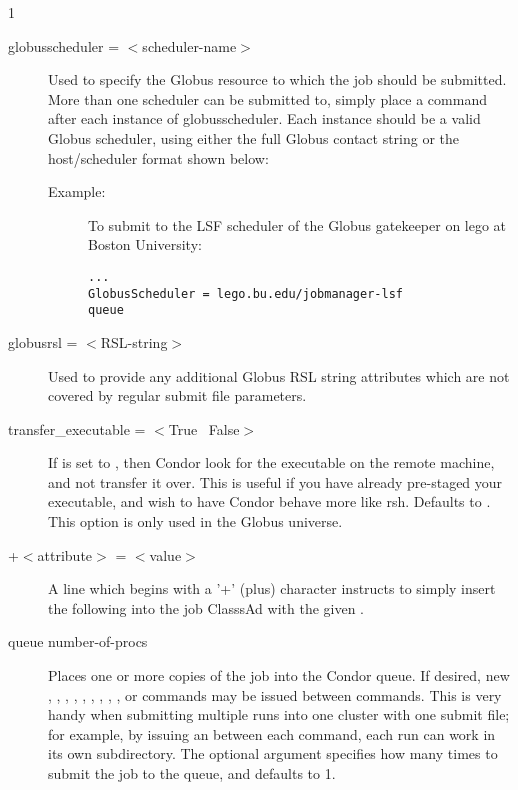 \begin{ManPage}{\label{man-condor-submit}}{1}
\begin{description}

\item[globusscheduler = $<$scheduler-name$>$] Used to specify the 
Globus resource to which the job should be submitted. More than one scheduler
can be submitted to, simply place a  command after each instance
of globusscheduler. Each instance should be a valid Globus scheduler, using
either the full Globus contact string or the host/scheduler format shown below:
\begin{description}
\item[Example:]
To submit to the LSF scheduler of the Globus gatekeeper on lego at 
Boston University:
\begin{verbatim}
...
GlobusScheduler = lego.bu.edu/jobmanager-lsf
queue
\end{verbatim}
\end{description}


\item[globusrsl = $<$RSL-string$>$] Used to provide any additional Globus RSL
string attributes which are not covered by regular submit file parameters.


\item[transfer\_executable = $<$True \Bar\ False$>$] If  is set to
, then Condor look for the executable on the remote machine, and
not transfer it over. This is useful if you have already pre-staged your
executable, and wish to have Condor behave more like rsh. Defaults to .
This option is only used in the Globus universe.


\item[+$<$attribute$>$ = $<$value$>$] A line which begins with a '+'
(plus) character instructs  to simply insert the
following  into the job ClasssAd with the given 
. 


\item[queue \Lbr number-of-procs \Rbr] Places one or more copies of the job into
the Condor queue. If desired, new , ,
, , , ,
, , , or 
commands may be issued between  commands. This is very handy
when submitting multiple runs into one cluster with one submit file; for
example, by issuing an  between each 
command, each run can work in its own subdirectory. The optional
argument  specifies how many times to submit the
job to the queue, and defaults to 1.


\end{description}
\end{ManPage}
